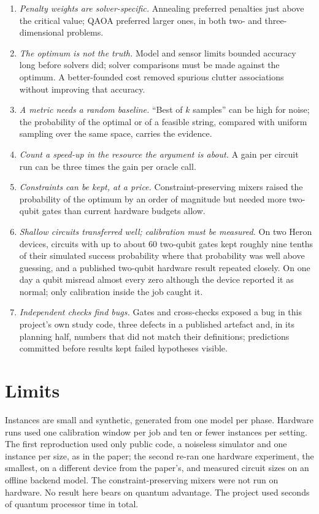\documentclass[11pt,a4paper]{article}
\begin{document}
\begin{enumerate}
\item \emph{Penalty weights are solver-specific.} Annealing preferred penalties just above the critical value; QAOA preferred larger ones,
      in both two- and three-dimensional problems.
\item \emph{The optimum is not the truth.} Model and sensor limits bounded accuracy long before solvers did; solver comparisons must be
      made against the optimum. A better-founded cost removed spurious clutter associations without improving that accuracy.
\item \emph{A metric needs a random baseline.} ``Best of $k$ samples'' can be high for noise; the probability of the optimal or of a
      feasible string, compared with uniform sampling over the same space, carries the evidence.
\item \emph{Count a speed-up in the resource the argument is about.} A gain per circuit run can be three times the gain per oracle call.
\item \emph{Constraints can be kept, at a price.} Constraint-preserving mixers raised the probability of the optimum by an order of magnitude
      but needed more two-qubit gates than current hardware budgets allow.
\item \emph{Shallow circuits transferred well; calibration must be measured.} On two Heron devices, circuits with up to about 60 two-qubit
      gates kept roughly nine tenths of their simulated success probability where that probability was well above guessing, and a
      published two-qubit hardware result repeated closely. On one day a qubit misread almost every zero although the device reported it as
      normal; only calibration inside the job caught it.
\item \emph{Independent checks find bugs.} Gates and cross-checks exposed a bug in this project's own study code, three defects in a
      published artefact and, in its planning half, numbers that did not match their definitions; predictions committed before results kept
      failed hypotheses visible.
\end{enumerate}

\section{Limits}

Instances are small and synthetic, generated from one model per phase. Hardware runs used one calibration window per job and ten or fewer
instances per setting. The first reproduction used only public code, a noiseless simulator and one instance per size, as in the paper; the
second re-ran one hardware experiment, the smallest, on a different device from the paper's, and measured circuit sizes on an offline
backend model. The constraint-preserving mixers were not run on hardware. No result here bears on quantum advantage. The project used
\QPUSecondsTotal{} seconds of quantum processor time in total.
\end{document}
